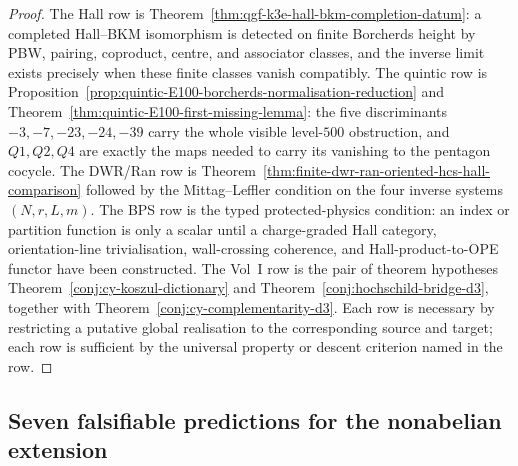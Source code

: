 \begin{proof}
The Hall row is Theorem~\ref{thm:qgf-k3e-hall-bkm-completion-datum}:
a completed Hall--BKM isomorphism is detected on finite Borcherds
height by PBW, pairing, coproduct, centre, and associator classes, and
the inverse limit exists precisely when these finite classes vanish
compatibly. The quintic row is
Proposition~\ref{prop:quintic-E100-borcherds-normalisation-reduction}
and Theorem~\ref{thm:quintic-E100-first-missing-lemma}: the five
discriminants \(-3,-7,-23,-24,-39\) carry the whole visible
level-\(500\) obstruction, and \(Q1,Q2,Q4\) are exactly the maps needed
to carry its vanishing to the pentagon cocycle. The DWR/Ran row is
Theorem~\ref{thm:finite-dwr-ran-oriented-hcs-hall-comparison} followed
by the Mittag--Leffler condition on the four inverse systems
\((N,r,L,m)\). The BPS row is the typed protected-physics condition:
an index or partition function is only a scalar until a charge-graded
Hall category, orientation-line trivialisation, wall-crossing coherence,
and Hall-product-to-OPE functor have been constructed. The Vol~I row is
the pair of theorem hypotheses
Theorem~\ref{conj:cy-koszul-dictionary} and
Theorem~\ref{conj:hochschild-bridge-d3}, together with
Theorem~\ref{conj:cy-complementarity-d3}. Each row is necessary by
restricting a putative global realisation to the corresponding source
and target; each row is sufficient by the universal property or descent
criterion named in the row.
\end{proof}

\subsection{Seven falsifiable predictions for the nonabelian extension}
\label{subsec:cy-c-falsifiable}

